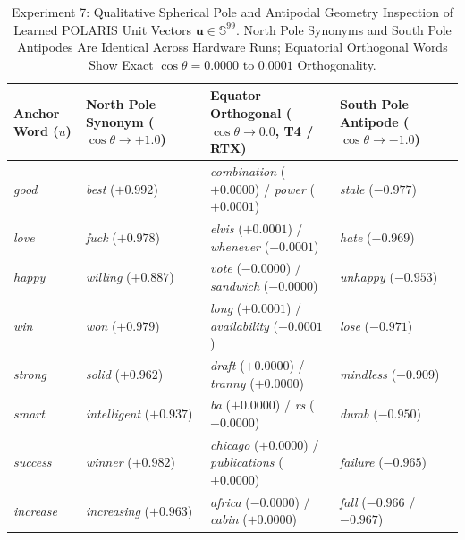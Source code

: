 \documentclass[journal]{IEEEtran}
\begin{document}
\begin{table}[!t]
\centering
\caption{Experiment 7: Qualitative Spherical Pole and Antipodal Geometry Inspection of Learned POLARIS Unit Vectors $\mathbf{u} \in \mathbb{S}^{99}$. North Pole Synonyms and South Pole Antipodes Are Identical Across Hardware Runs; Equatorial Orthogonal Words Show Exact $\cos\theta = 0.0000$ to $0.0001$ Orthogonality.}
\label{tab:exp7_qualitative}
\begin{tabular}{llll}
\toprule
\textbf{Anchor Word ($u$)} & \textbf{North Pole Synonym ($\cos\theta \to +1.0$)} & \textbf{Equator Orthogonal ($\cos\theta \to 0.0$, T4 / RTX)} & \textbf{South Pole Antipode ($\cos\theta \to -1.0$)} \\
\midrule
\textit{good} & \textit{best} ($+0.992$) & \textit{combination} ($+0.0000$) / \textit{power} ($+0.0001$) & \textit{stale} ($-0.977$) \\
\textit{love} & \textit{fuck} ($+0.978$) & \textit{elvis} ($+0.0001$) / \textit{whenever} ($-0.0001$) & \textit{hate} ($-0.969$) \\
\textit{happy} & \textit{willing} ($+0.887$) & \textit{vote} ($-0.0000$) / \textit{sandwich} ($-0.0000$) & \textit{unhappy} ($-0.953$) \\
\textit{win} & \textit{won} ($+0.979$) & \textit{long} ($+0.0001$) / \textit{availability} ($-0.0001$) & \textit{lose} ($-0.971$) \\
\textit{strong} & \textit{solid} ($+0.962$) & \textit{draft} ($+0.0000$) / \textit{tranny} ($+0.0000$) & \textit{mindless} ($-0.909$) \\
\textit{smart} & \textit{intelligent} ($+0.937$) & \textit{ba} ($+0.0000$) / \textit{rs} ($-0.0000$) & \textit{dumb} ($-0.950$) \\
\textit{success} & \textit{winner} ($+0.982$) & \textit{chicago} ($+0.0000$) / \textit{publications} ($+0.0000$) & \textit{failure} ($-0.965$) \\
\textit{increase} & \textit{increasing} ($+0.963$) & \textit{africa} ($-0.0000$) / \textit{cabin} ($+0.0000$) & \textit{fall} ($-0.966$ / $-0.967$) \\
\bottomrule
\end{tabular}
\end{table}
\end{document}
